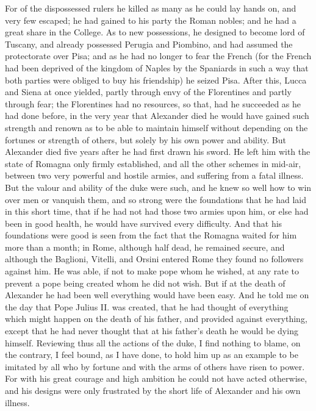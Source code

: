 \documentclass[12pt,letterpaper]{memoir}
\begin{document}
For of the dispossessed rulers he killed as many as he could lay hands
on, and very few escaped; he had gained to his party the Roman nobles;
and he had a great share in the College. As to new possessions, he
designed to become lord of Tuscany, and already possessed Perugia and
Piombino, and had assumed the protectorate over Pisa; and as he had
no longer to fear the French (for the French had been deprived of the
kingdom of Naples by the Spaniards in such a way that both parties
were obliged to buy his friendship) he seized Pisa. After this, Lucca
and Siena at once yielded, partly through envy of the Florentines and
partly through fear; the Florentines had no resources, so that, had he
succeeded as he had done before, in the very year that Alexander died
he would have gained such strength and renown as to be able to maintain
himself without depending on the fortunes or strength of others, but
solely by his own power and ability. But Alexander died five years
after he had first drawn his sword. He left him with the state of
Romagna only firmly established, and all the other schemes in mid-air,
between two very powerful and hostile armies, and suffering from a
fatal illness. But the valour and ability of the duke were such, and
he knew so well how to win over men or vanquish them, and so strong
were the foundations that he had laid in this short time, that if he
had not had those two armies upon him, or else had been in good health,
he would have survived every difficulty. And that his foundations were
good is seen from the fact that the Romagna waited for him more than a
month; in Rome, although half dead, he remained secure, and although
the Baglioni, Vitelli, and Orsini entered Rome they found no followers
against him. He was able, if not to make pope whom he wished, at any
rate to prevent a pope being created whom he did not wish. But if at
the death of Alexander he had been well everything would have been
easy. And he told me on the day that Pope Julius II. was created,
that he had thought of everything which might happen on the death of
his father, and provided against everything, except that he had never
thought that at his father's death he would be dying himself. Reviewing
thus all the actions of the duke, I find nothing to blame, on the
contrary, I feel bound, as I have done, to hold him up as an example
to be imitated by all who by fortune and with the arms of others have
risen to power. For with his great courage and high ambition he could
not have acted otherwise, and his designs were only frustrated by the
short life of Alexander and his own illness.
\end{document}
